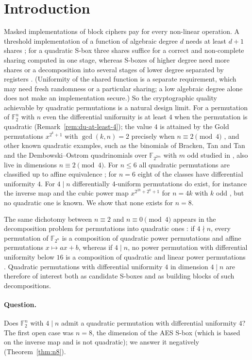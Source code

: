 \documentclass[11pt]{article}
\theoremstyle{definition}
\newcommand{\F}{\mathbb{F}}
\begin{document}
\section{Introduction}
Masked implementations of block ciphers pay for every non-linear operation. A threshold
implementation of a function of algebraic degree $d$ needs at least $d+1$ shares
\cite{NRR06}; for a quadratic S-box three shares suffice for a correct and non-complete sharing
computed in one stage, whereas S-boxes of higher degree need more shares or a decomposition
into several stages of lower degree separated by registers \cite{BNNRS15}. (Uniformity of the
shared function is a separate requirement, which may need fresh randomness or a particular
sharing; a low algebraic degree alone does not make an implementation secure.) So the
cryptographic quality achievable by quadratic permutations is a natural design limit. For a permutation of $\F_2^n$ with $n$ even
the differential uniformity is at least $4$ when the permutation is quadratic
(Remark~\ref{rem:du-at-least-4}); the value $4$ is attained by the Gold permutations
$x^{2^k+1}$ with $\gcd(k,n)=2$ precisely when $n\equiv 2\pmod 4$ \cite{Gold68,Nyb93}, and
other known quadratic examples, such as the binomials of Bracken, Tan and Tan \cite{BTT12}
and the Dembowski--Ostrom quadrinomials over $\F_{2^{2m}}$ with $m$ odd studied in
\cite{KMCLLJ22}, also live in dimensions $n\equiv 2\pmod 4$. For $n\le6$ all quadratic
permutations are classified up to affine equivalence \cite{DMB19}; for $n=6$ eight of the
classes have differential uniformity $4$. For $4\mid n$ differentially
4-uniform permutations do exist, for instance the inverse map \cite{Nyb93} and the cubic power
map $x^{2^{2k}+2^k+1}$ for $n=4k$ with $k$ odd \cite{BL10}, but no quadratic one is known. We
show that none exists for $n=8$.

The same dichotomy between $n\equiv 2$ and $n\equiv 0\pmod 4$ appears in the decomposition
problem for permutations into quadratic ones \cite{NNR19}: if $4\nmid n$, every permutation of
$\F_{2^n}$ is a composition of quadratic power permutations and affine permutations $x\mapsto
ax+b$, whereas if $4\mid n$, no power permutation with differential uniformity below $16$ is a
composition of quadratic and linear power permutations \cite{ACPBSN25}. Quadratic
permutations with differential uniformity $4$ in dimension $4\mid n$ are therefore of interest
both as candidate S-boxes and as building blocks of such decompositions.

\paragraph{Question.} Does $\F_2^n$ with $4\mid n$ admit a quadratic permutation with
differential uniformity $4$? The first open case was $n=8$, the dimension of the AES S-box
(which is based on the inverse map and is not quadratic); we answer it negatively (Theorem~\ref{thm:n8}).
\end{document}
